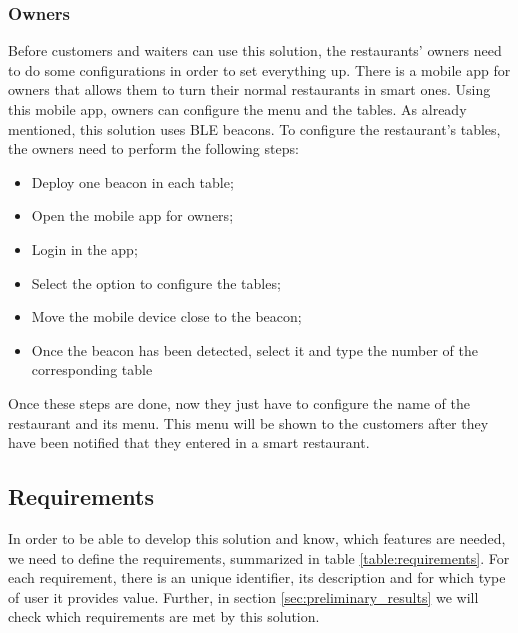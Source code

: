 \subsubsection{Owners}
\label{sub:owners}
Before customers and waiters can use this solution, the restaurants' owners
need to do some configurations in order to set everything up.
There is a mobile app for owners that allows them to turn their normal
restaurants in smart ones.
Using this mobile app, owners can configure the menu and the tables.
As already mentioned, this solution uses BLE beacons. To configure
the restaurant's tables, the owners need to perform the following steps:
\begin{itemize}
  \item Deploy one beacon in each table;
  \item Open the mobile app for owners;
  \item Login in the app;
  \item Select the option to configure the tables;
  \item Move the mobile device close to the beacon;
  \item Once the beacon has been detected, select it and type the number
  of the corresponding table
\end{itemize}
Once these steps are done, now they just have to configure the name of the
restaurant and its menu. This menu will be shown to the customers after they
have been notified that they entered in a smart restaurant.

\subsection{Requirements}
\label{sub:requirements}
In order to be able to develop this solution and know, which features are
needed, we need to define the requirements, summarized in table
\ref{table:requirements}. For each requirement, there is an unique
identifier, its description and for which type of user it provides value.
Further, in section \ref{sec:preliminary_results} we will check which
requirements are met by this solution.

